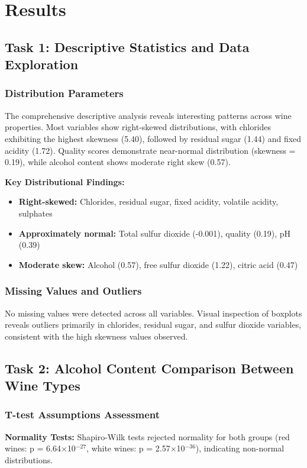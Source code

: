 \chapter{Results}

\section{Task 1: Descriptive Statistics and Data Exploration}

\subsection{Distribution Parameters}
The comprehensive descriptive analysis reveals interesting patterns across wine properties. Most variables show right-skewed distributions, with chlorides exhibiting the highest skewness (5.40), followed by residual sugar (1.44) and fixed acidity (1.72). Quality scores demonstrate near-normal distribution (skewness = 0.19), while alcohol content shows moderate right skew (0.57).

\textbf{Key Distributional Findings:}
\begin{itemize}
\item \textbf{Right-skewed:} Chlorides, residual sugar, fixed acidity, volatile acidity, sulphates
\item \textbf{Approximately normal:} Total sulfur dioxide (-0.001), quality (0.19), pH (0.39)
\item \textbf{Moderate skew:} Alcohol (0.57), free sulfur dioxide (1.22), citric acid (0.47)
\end{itemize}

\subsection{Missing Values and Outliers}
No missing values were detected across all variables. Visual inspection of boxplots reveals outliers primarily in chlorides, residual sugar, and sulfur dioxide variables, consistent with the high skewness values observed.

\section{Task 2: Alcohol Content Comparison Between Wine Types}

\subsection{T-test Assumptions Assessment}
\textbf{Normality Tests:} Shapiro-Wilk tests rejected normality for both groups (red wines: p = 6.64$\times$10$^{-27}$, white wines: p = 2.57$\times$10$^{-36}$), indicating non-normal distributions.

